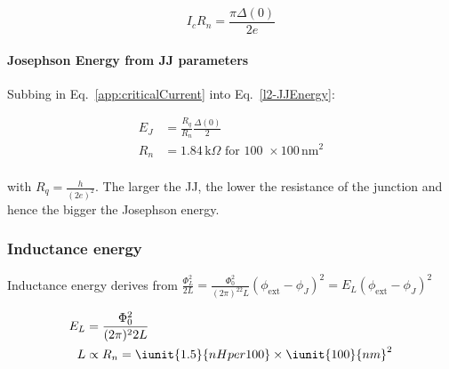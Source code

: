    \begin{equation}\label{app:criticalCurrent}
     I_cR_n = \frac{\pi\Delta(0)}{2e}
   \end{equation}


   \begin{framed}\noindent
     \paragraph{Josephson   Energy  from   JJ  parameters}   Subbing  in
     Eq.~\eqref{app:criticalCurrent} into Eq.~\eqref{l2-JJEnergy}:

     \begin{equation}\label{key}
       \begin{aligned}
         E_J & = \frac{R_q}{R_n}\frac{\Delta(0)}{2}\\
         R_n & = 1.84\,\text{k}\Omega \text{ for 100 } \times 100\,\text{nm}^2\\
       \end{aligned}
     \end{equation}

     \noindent with $  R_q = \frac{h}{(2e)^2} $. The larger  the JJ, the
     lower  the resistance  of the  junction  and hence  the bigger  the
     Josephson energy.

   \end{framed}

   \subsubsection{Inductance energy}
   Inductance              energy              derives              from
   $                        \frac{\Phi_L^2}{2L}                        =
   \frac{\Phi_0^2}{(2\pi)^22L}(\phi_\text{ext}-\phi_J)^2               =
   E_L(\phi_\text{ext}-\phi_J)^2 $

   \begin{equation}
     \begin{aligned}
       E_L & = \frac{\Phi_0^2}{(2\pi)^22L}\\
       L & \propto R_n = \iunit{1.5}{nH per 100}\times\iunit{100}{nm}^2
     \end{aligned}
   \end{equation}

